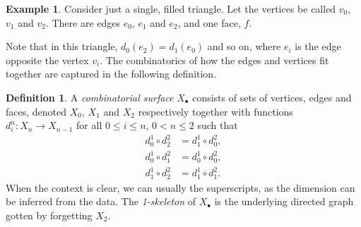 \documentclass{tufte-handout}
\theoremstyle{definition}
\newtheorem{definition}{Definition}
\newtheorem{example}{Example}
\begin{document}
\begin{example}\label{eg:triangle_Delta_complex}
Consider
 just a single, filled triangle. Let the vertices be called $v_0$, $v_1$ and 
$v_2$. There are edges $e_0$, $e_1$ and $e_2$, and one face, $f$.
\end{example}

Note that in this triangle, $d_0(e_2)=d_1(e_0)$ and so on, where $e_i$ is the edge opposite 
the vertex $v_i$. The combinatorics of how the edges and vertices fit together are captured
in the following definition. 


\begin{definition}

A \emph{combinatorial surface} $X_\bullet$ consists of sets of vertices, 
edges and faces, denoted $X_0$, $X_1$ and $X_2$ respectively together with 
functions $d_i^n\colon X_n \to X_{n-1}$ for all $0\leq i \leq n$, $0<n\leq 2$ such 
that
\begin{align}\label{eq:simpl_ids_surf}
d_0^1\circ d_2^2 & = d_1^1\circ d_0^2, \nonumber\\
d_0^1\circ d_1^2 & = d_0^1\circ d_0^2,\\
d_1^1\circ d_2^2 & = d_1^1\circ d_1^2. \nonumber
\end{align}
When the context is clear, we can usually the superscripts, as the dimension can be inferred
from the data. The \emph{1-skeleton} of $X_\bullet$ is the underlying directed graph 
gotten by forgetting $X_2$.
\end{definition}
\end{document}
